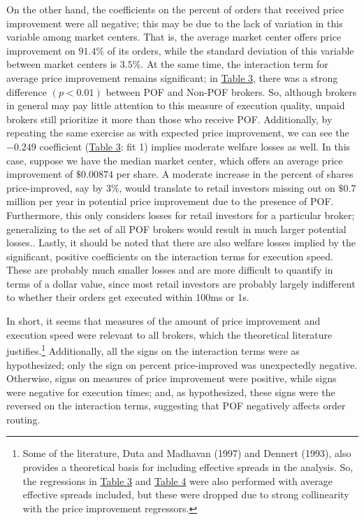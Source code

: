 \documentclass[12pt,a4paper]{extarticle}
\begin{document}
On the other hand, the coefficients on the percent of orders that received price improvement were all negative; this may be due to the lack of variation in this variable among market centers. That is, the average market center offers price improvement on $91.4\%$ of its orders, while the standard deviation of this variable between market centers is $3.5\%$. At the same time, the interaction term for average price improvement remains significant; in \hyperref[table:3]{Table 3}, there was a strong difference $(p < 0.01)$  between POF and Non-POF brokers. So, although brokers in general may pay little attention to this measure of execution quality, unpaid brokers still prioritize it more than those who receive POF. Additionally, by repeating the same exercise as with expected price improvement, we can see the $-0.249$ coefficient (\hyperref[table:3]{Table 3}: fit 1) implies moderate welfare losses as well. In this case, suppose we have the median market center, which offers an average price improvement of $\$0.00874$ per share. A moderate increase in the percent of shares price-improved, say by $3\%$, would translate to retail investors missing out on $\$0.7$ million per year in potential price improvement due to the presence of POF. Furthermore, this only considers losses for retail investors for a particular broker; generalizing to the set of all POF brokers would result in much larger potential losses.. Lastly, it should be noted that there are also welfare losses implied by the significant, positive coefficients on the interaction terms for execution speed. These are probably much smaller losses and are more difficult to quantify in terms of a dollar value, since most retail investors are probably largely indifferent to whether their orders get executed within 100ms or 1s.  

In short, it seems that measures of the amount of price improvement and execution speed were relevant to all brokers, which the theoretical literature justifies.\footnote{ Some of the literature, Duta and Madhavan (1997) and Dennert (1993),  also provides a theoretical basis for including effective spreads in the analysis. So, the regressions in \hyperref[table:3]{Table 3} and \hyperref[table:4]{Table 4} were also performed with average effective spreads included, but these were dropped due to strong collinearity with the price improvement regressors.} Additionally, all the signs on the interaction terms were as hypothesized; only the sign on percent price-improved was unexpectedly negative. Otherwise, signs on measures of price improvement were positive, while signs were negative for execution times; and, as hypothesized, these signs were the reversed on the interaction terms, suggesting that POF negatively affects order routing.
\end{document}
